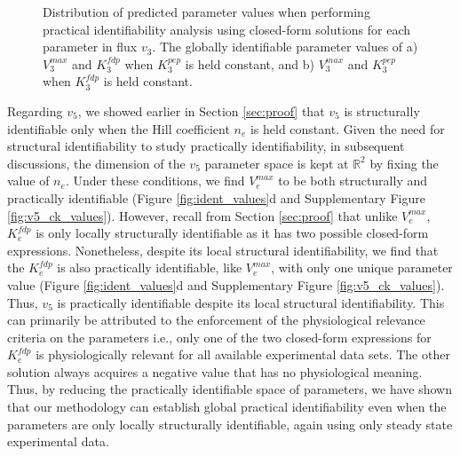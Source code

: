 \documentclass[10pt]{article}
\begin{document}
	\begin{figure}[!tbhp]
		\caption{Distribution of predicted parameter values when performing practical identifiability analysis using closed-form solutions for each parameter in flux $v_3$. The globally identifiable parameter values of a)  $V_3^{max}$ and $K_3^{fdp}$ when $K_3^{pep}$ is held constant, and b) $V_3^{max}$ and $K_3^{pep}$ when $K_3^{fdp}$ is held constant.}\label{fig:v3_var_ck_values}
	\end{figure}	
	
	Regarding $v_5$, we showed earlier in Section \ref{sec:proof} that $v_5$ is structurally identifiable only when the Hill coefficient $n_e$ is held constant. Given the need for structural identifiability to study practically identifiability, in subsequent discussions, the dimension of the $v_5$ parameter space is kept at $\mathbb{R}^2$ by fixing the value of $n_e$. Under these conditions, we find $V_e^{max}$ to be both structurally and practically identifiable (Figure \ref{fig:ident_values}d and Supplementary Figure \ref{fig:v5_ck_values}). However, recall from Section \ref{sec:proof} that unlike $V_e^{max}$, $K_e^{fdp}$ is only locally structurally identifiable as it has two possible closed-form expressions. Nonetheless, despite its local structural identifiability, we find that the $K_e^{fdp}$ is also practically identifiable, like $V_e^{max}$, with only one unique parameter value (Figure \ref{fig:ident_values}d and Supplementary Figure \ref{fig:v5_ck_values}). Thus, $v_5$ is practically identifiable despite its local structural identifiability. This can primarily be attributed to the enforcement of the physiological relevance criteria on the parameters i.e., only one of the two closed-form expressions for $K_e^{fdp}$ is physiologically relevant for all available experimental data sets.
	 The other solution always acquires a negative value that has no physiological meaning. Thus, by reducing the practically identifiable space of parameters, we have shown that our methodology can establish global practical identifiability even when the parameters are only locally structurally identifiable, again using only steady state experimental data. 
	 
\end{document}
